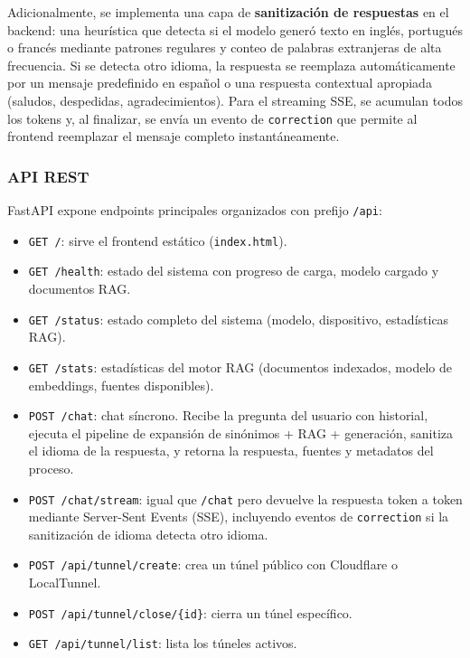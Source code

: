 Adicionalmente, se implementa una capa de \textbf{sanitización de respuestas} en el backend: una heurística que detecta si el modelo generó texto en inglés, portugués o francés mediante patrones regulares y conteo de palabras extranjeras de alta frecuencia. Si se detecta otro idioma, la respuesta se reemplaza automáticamente por un mensaje predefinido en español o una respuesta contextual apropiada (saludos, despedidas, agradecimientos). Para el streaming SSE, se acumulan todos los tokens y, al finalizar, se envía un evento de \texttt{correction} que permite al frontend reemplazar el mensaje completo instantáneamente.

\subsubsection{API REST}

FastAPI expone endpoints principales organizados con prefijo \texttt{/api}:

\begin{itemize}
    \item \texttt{GET /}: sirve el frontend estático (\texttt{index.html}).
    \item \texttt{GET /health}: estado del sistema con progreso de carga, modelo cargado y documentos RAG.
    \item \texttt{GET /status}: estado completo del sistema (modelo, dispositivo, estadísticas RAG).
    \item \texttt{GET /stats}: estadísticas del motor RAG (documentos indexados, modelo de embeddings, fuentes disponibles).
    \item \texttt{POST /chat}: chat síncrono. Recibe la pregunta del usuario con historial, ejecuta el pipeline de expansión de sinónimos + RAG + generación, sanitiza el idioma de la respuesta, y retorna la respuesta, fuentes y metadatos del proceso.
    \item \texttt{POST /chat/stream}: igual que \texttt{/chat} pero devuelve la respuesta token a token mediante Server-Sent Events (SSE), incluyendo eventos de \texttt{correction} si la sanitización de idioma detecta otro idioma.
    \item \texttt{POST /api/tunnel/create}: crea un túnel público con Cloudflare o LocalTunnel.
    \item \texttt{POST /api/tunnel/close/\{id\}}: cierra un túnel específico.
    \item \texttt{GET /api/tunnel/list}: lista los túneles activos.
\end{itemize}

